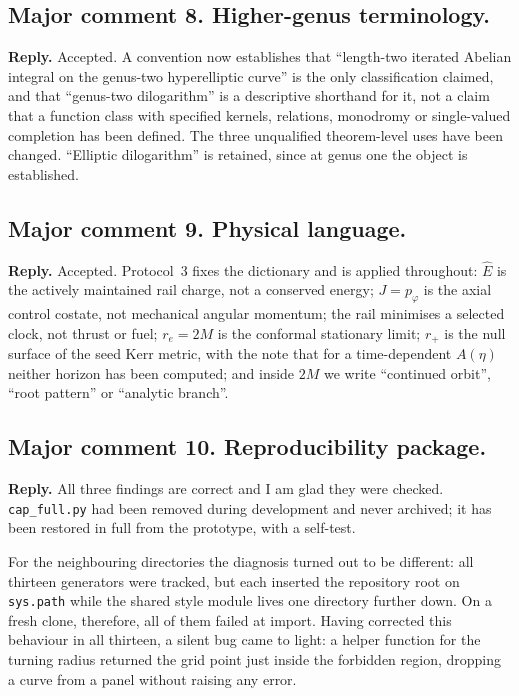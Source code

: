 \documentclass{article}
\begin{document}
\subsection{Major comment 8. Higher-genus terminology.}
\textbf{Reply.} Accepted. A convention now establishes that ``length-two iterated
Abelian integral on the genus-two hyperelliptic curve'' is the only classification
claimed, and that ``genus-two dilogarithm'' is a descriptive shorthand for it, not a
claim that a function class with specified kernels, relations, monodromy or
single-valued completion has been defined. The three unqualified theorem-level uses
have been changed. ``Elliptic dilogarithm'' is retained, since at genus one the
object is established.

\subsection{Major comment 9. Physical language.}
\textbf{Reply.} Accepted. Protocol~3 fixes the dictionary and is applied
throughout: \(\hat E\) is the actively maintained rail charge, not a conserved
energy; \(J = p_\varphi\) is the axial control costate, not mechanical angular
momentum; the rail minimises a selected clock, not thrust or fuel; \(r_e=2M\) is the
conformal stationary limit; \(r_+\) is the null surface of the seed Kerr metric,
with the note that for a time-dependent \(A(\eta)\) neither horizon has been
computed; and inside \(2M\) we write ``continued orbit'', ``root pattern'' or
``analytic branch''.

\subsection{Major comment 10. Reproducibility package.}
\textbf{Reply.} All three findings are correct and I am glad they were checked.
\texttt{cap\_full.py} had been removed during development and never archived; it has
been restored in full from the prototype, with a self-test.

For the neighbouring directories the diagnosis turned out to be different: all
thirteen generators were tracked, but each inserted the repository root on
\texttt{sys.path} while the shared style module lives one directory further down. On
a fresh clone, therefore, all of them failed at import. Having corrected this
behaviour in all thirteen, a silent bug came to light: a helper function for the
turning radius returned the grid point just inside the forbidden region, dropping a
curve from a panel without raising any error.
\end{document}
